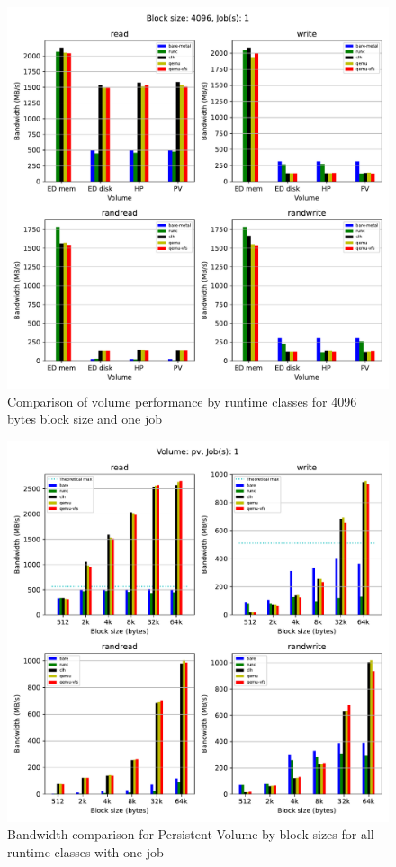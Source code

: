 \begin{figure}[ht]
  \begin{center}
    \includegraphics[width=12cm]{results/subplot_bw_by_volume_with_bare(4096,1).pdf}
    \caption{Comparison of volume performance by runtime classes for 4096 bytes block size and one job}
    \label{fig:ResultsVolumeByRTC4096-1}
  \end{center}
\end{figure}


\begin{figure}[ht]
  \begin{center}
    \includegraphics[width=12cm]{results/subplot_bw_by_bs_with_bare(pv,1).pdf}
    \caption{Bandwidth comparison for Persistent Volume by block sizes for all runtime classes with one job}
    \label{fig:ResultsPVByBS-1}
  \end{center}
\end{figure}
 

